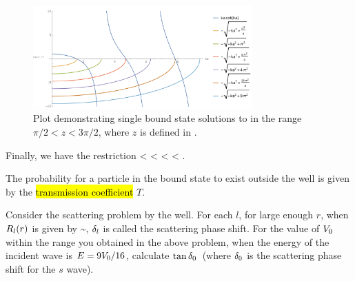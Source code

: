 \begin{solution}
	\begin{figure} \centering
		\includegraphics[width=0.75\textwidth]{plot2}
		\caption{Plot demonstrating single bound state solutions to  in the range $\pi/2 < z < 3\pi/2$, where $z$ is defined in .}
		\label{plot2}
	\end{figure}
	
	Finally, we have the restriction
	\beqn \label{range}
		 <  < 
		\qimplies
		 < \Vo < .
	\eeqn
	
	The probability for a particle in the bound state to exist outside the well is given by the \hl{transmission coefficient} $T$.
\end{solution}



\begin{problem}
	Consider the scattering problem by the well.  For each $l$, for large enough $r$, when $R_l(r)$ is given by
	\beqn \label{outside}
		\Rlr \sim \Al {},
	\eeqn
	$\delta_l$ is called the scattering phase shift.  For the value of $V_0$ within the range you obtained in the above problem, when the energy of the incident wave is $E = 9 V_0 / 16$, calculate $\tan\delta_0$~(where $\delta_0$ is the scattering phase shift for the $s$ wave).
\end{problem}

